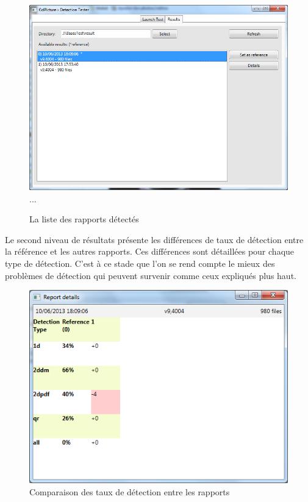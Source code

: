 \begin{figure}
\begin{center}
\includegraphics[scale=0.5]{images/projet1RapportWindow.png}...
\end{center}
\caption{La liste des rapports détectés}
\label{niveau1}
\end{figure}

\clearpage

Le second niveau de résultats présente les différences de taux de détection entre la référence et les autres rapports. Ces différences sont détaillées pour chaque type de détection. C'est à ce stade que l'on se rend compte le mieux des problèmes de détection qui peuvent survenir comme ceux expliqués plus haut.

\begin{figure}
\begin{center}
\includegraphics[scale=0.6]{images/projet1RapportWindow2.png}
\end{center}
\caption{Comparaison des taux de détection entre les rapports}
\label{niveau2}
\end{figure}

